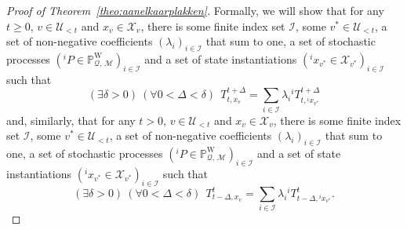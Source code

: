 \documentclass[10pt,a4paper]{paper}
\theoremstyle{definition}
\newcommand{\states}{\mathcal{X}}
\newcommand{\processes}{\mathbb{P}}
\newcommand{\wprocesses}{\processes^{\mathrm{W}}}
\newcommand{\rateset}{\mathcal{Q}}
\begin{document}
\begin{proof}[Proof of Theorem~\ref{theo:aanelkaarplakken}]
Formally, we will show that for any $t\geq0$, $v\in\mathcal{U}_{<t}$ and $x_v\in\states_v$, there is some finite index set $\mathcal{I}$, some $v^*\in\mathcal{U}_{<t}$, a set of non-negative coefficients $(\lambda_i)_{i\in \mathcal{I}}$ that sum to one, a set of stochastic processes $({}^iP\in\wprocesses_{\rateset,\,\mathcal{M}})_{i\in \mathcal{I}}$ and a set of state instantiations $({}^ix_{v^*}\in\states_{v^*})_{i\in \mathcal{I}}$ such that
\begin{equation}\label{eq:theo:aanelkaarplakken:convexTright}
(\exists \delta>0)~(\forall 0<\Delta<\delta)~~
T_{t,x_v}^{t+\Delta}
=\sum_{i\in \mathcal{I}}\lambda_i
{}^iT_{t,{}^ix_{v^*}}^{t+\Delta}
\end{equation}
and, similarly, that for any $t>0$, $v\in\mathcal{U}_{<t}$ and $x_v\in\states_v$, there is some finite index set $\mathcal{I}$, some $v^*\in\mathcal{U}_{<t}$, a set of non-negative coefficients $(\lambda_i)_{i\in \mathcal{I}}$ that sum to one, a set of stochastic processes $({}^iP\in\wprocesses_{\rateset,\,\mathcal{M}})_{i\in \mathcal{I}}$ and a set of state instantiations $({}^ix_{v^*}\in\states_{v^*})_{i\in \mathcal{I}}$ such that
\begin{equation}\label{eq:theo:aanelkaarplakken:convexTleft}
(\exists \delta>0)~(\forall 0<\Delta<\delta)~~
T_{t-\Delta,x_v}^{t}
=\sum_{i\in \mathcal{I}}\lambda_i
{}^iT_{t-\Delta,{}^ix_{v^*}}^{t}.
\end{equation}


\end{proof}
\end{document}
